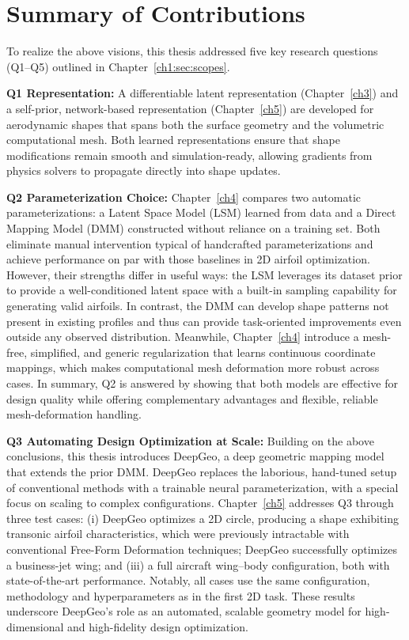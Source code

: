 \section{Summary of Contributions}

To realize the above visions, this thesis addressed five key research questions (Q1–Q5) outlined in Chapter~\ref{ch1:sec:scopes}.

\textbf{Q1 Representation:} A differentiable latent representation (Chapter~\ref{ch3}) and a self-prior, network-based representation (Chapter~\ref{ch5}) are developed for aerodynamic shapes that spans both the surface geometry and the volumetric computational mesh. Both learned representations ensure that shape modifications remain smooth and simulation-ready, allowing gradients from physics solvers to propagate directly into shape updates.

\textbf{Q2 Parameterization Choice:} Chapter~\ref{ch4} compares two automatic parameterizations: a Latent Space Model (LSM) learned from data and a Direct Mapping Model (DMM) constructed without reliance on a training set. Both eliminate manual intervention typical of handcrafted parameterizations and achieve performance on par with those baselines in 2D airfoil optimization. However, their strengths differ in useful ways: the LSM leverages its dataset prior to provide a well-conditioned latent space with a built-in sampling capability for generating valid airfoils. In contrast, the DMM can develop shape patterns not present in existing profiles and thus can provide task-oriented improvements even outside any observed distribution. Meanwhile, Chapter~\ref{ch4} introduce a mesh-free, simplified, and generic regularization that learns continuous coordinate mappings, which makes computational mesh deformation more robust across cases. In summary, Q2 is answered by showing that both models are effective for design quality while offering complementary advantages and flexible, reliable mesh-deformation handling.

\textbf{Q3 Automating Design Optimization at Scale:} Building on the above conclusions, this thesis introduces DeepGeo, a deep geometric mapping model that extends the prior DMM. DeepGeo replaces the laborious, hand-tuned setup of conventional methods with a trainable neural parameterization, with a special focus on scaling to complex configurations. Chapter~\ref{ch5} addresses Q3 through three test cases: (i) DeepGeo optimizes a 2D circle, producing a shape exhibiting transonic airfoil characteristics, which were previously intractable with conventional Free-Form Deformation techniques; DeepGeo successfully optimizes a business-jet wing; and (iii) a full aircraft wing–body configuration, both with state-of-the-art performance. Notably, all cases use the same configuration, methodology and hyperparameters as in the first 2D task. These results underscore DeepGeo’s role as an automated, scalable geometry model for high-dimensional and high-fidelity design optimization.

